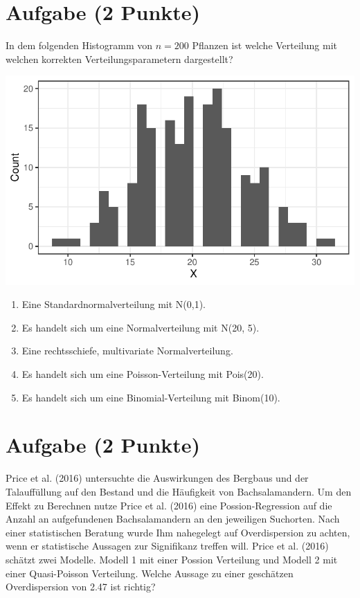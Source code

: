 \documentclass[a4paper, 10pt]{scrartcl}\usepackage[]{graphicx}\usepackage[]{xcolor}
\makeatletter
\def\maxwidth{ %
  \ifdim\Gin@nat@width>\linewidth
    \linewidth
  \else
    \Gin@nat@width
  \fi
}
\makeatother
\begin{document}
\section{Aufgabe \hfill (2 Punkte)}

In dem folgenden Histogramm von $n = 200$ Pflanzen ist welche Verteilung
mit welchen korrekten Verteilungsparametern dargestellt?



{\centering \includegraphics[width=\maxwidth]{img/mc-distribution-02-a-1} 

}







\begin{enumerate}
\item [\textbf{A} \msquare] Eine Standardnormalverteilung mit N(0,1).
\item [\textbf{B} \msquare] Es handelt sich um eine Normalverteilung mit N(20, 5).
\item [\textbf{C} \msquare] Eine rechtsschiefe, multivariate Normalverteilung.
\item [\textbf{D} \msquare] Es handelt sich um eine Poisson-Verteilung mit Pois(20).
\item [\textbf{E} \msquare] Es handelt sich um eine Binomial-Verteilung mit Binom(10).
\end{enumerate}

\section{Aufgabe \hfill (2 Punkte)}




Price et al. (2016) untersuchte die Auswirkungen des Bergbaus und der
Talauff{\"u}llung auf den Bestand und die H{\"a}ufigkeit von Bachsalamandern. Um
den Effekt zu Berechnen nutze Price et al. (2016) eine Possion-Regression
auf die Anzahl an aufgefundenen Bachsalamandern an den jeweiligen
Suchorten. Nach einer statistischen Beratung wurde Ihm nahegelegt auf
Overdispersion zu achten, wenn er statistische Aussagen zur Signifikanz
treffen will. Price et al. (2016) sch{\"a}tzt zwei Modelle. Modell 1 mit einer
Possion Verteilung und Modell 2 mit einer Quasi-Poisson Verteilung. Welche
Aussage zu einer gesch{\"a}tzen Overdispersion von 2.47 ist
richtig?
\end{document}
